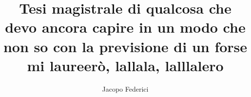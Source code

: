 \documentclass[]{article}
\title{Tesi magistrale di qualcosa che devo ancora capire in un modo che non so con la previsione di un forse mi laureerò, lallala, lalllalero}
\author{Jacopo Federici}
\begin{document}
	
	\maketitle
	
	\begin{abstract}
		
	\end{abstract}
	
	\section{}
	
\end{document}
